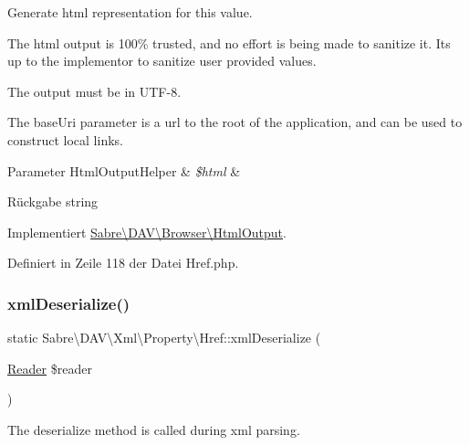 Generate html representation for this value.

The html output is 100\% trusted, and no effort is being made to sanitize it. It\textquotesingle{}s up to the implementor to sanitize user provided values.

The output must be in U\+T\+F-\/8.

The base\+Uri parameter is a url to the root of the application, and can be used to construct local links.


\begin{DoxyParams}[1]{Parameter}
Html\+Output\+Helper & {\em \$html} & \\
\hline
\end{DoxyParams}
\begin{DoxyReturn}{Rückgabe}
string 
\end{DoxyReturn}


Implementiert \mbox{\hyperlink{interface_sabre_1_1_d_a_v_1_1_browser_1_1_html_output_a53a24f82474cef8c1fcf00e87de3bf7c}{Sabre\textbackslash{}\+D\+A\+V\textbackslash{}\+Browser\textbackslash{}\+Html\+Output}}.



Definiert in Zeile 118 der Datei Href.\+php.

\mbox{\label{class_sabre_1_1_d_a_v_1_1_xml_1_1_property_1_1_href_a021325c5d0dc84191a83e9937d2078e5}} 
\subsubsection{\texorpdfstring{xml\+Deserialize()}{xmlDeserialize()}}
{\footnotesize\ttfamily static Sabre\textbackslash{}\+D\+A\+V\textbackslash{}\+Xml\textbackslash{}\+Property\textbackslash{}\+Href\+::xml\+Deserialize (\begin{DoxyParamCaption}\item[{\mbox{\hyperlink{class_sabre_1_1_xml_1_1_reader}{Reader}}}]{\$reader }\end{DoxyParamCaption})\hspace{0.3cm}{\ttfamily [static]}}

The deserialize method is called during xml parsing.

